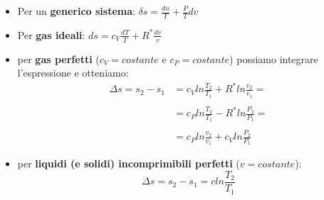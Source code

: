 \begin{itemize}
    \item Per un \textbf{generico sistema}: $\delta s = \frac{du}{T} + \frac{P}{T} dv$
    \item Per \textbf{gas ideali}: $ds = c_V \frac{dT}{T} + R^* \frac{dv}{v}$
    \item per \textbf{gas perfetti} ($c_V = costante$ e $c_P = costante$) possiamo integrare l'espressione e otteniamo: \newline
    \[
        \begin{matrix}
            \Delta s = s_2-s_1 &= c_V ln \frac{T_2}{T_1} + R^* ln \frac{v_2}{v_1} =\\
            \ \\
            &= c_P ln \frac{T_2}{T_1} - R^* ln \frac{P_2}{P_1} =\\
            \ \\
            &= c_P ln \frac{v_2}{v_1} + c_V ln \frac{P_2}{P_1}
        \end{matrix}
    \]
    \item per \textbf{liquidi (e solidi) incomprimibili perfetti} ($v = costante$): 
    \[
        \Delta s = s_2-s_1 = c ln \frac{T_2}{T_1}
    \]
\end{itemize}